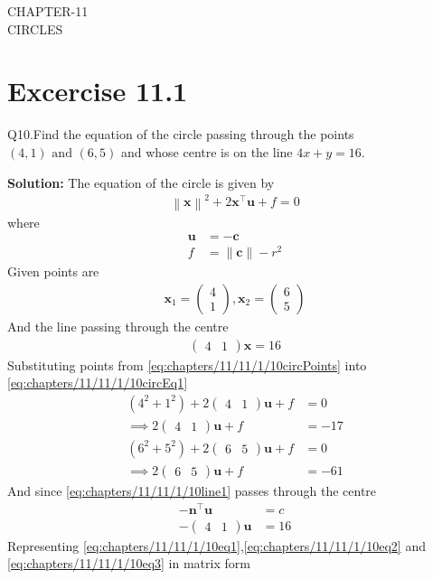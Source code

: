 \documentclass[12pt]{article}
\providecommand{\brak}[1]{\ensuremath{\left(#1\right)}}
\providecommand{\norm}[1]{\left\lVert#1\right\rVert}
\newcommand{\solution}{\noindent \textbf{Solution: }}
\newcommand{\myvec}[1]{\ensuremath{\begin{pmatrix}#1\end{pmatrix}}}
\let\vec\mathbf
\begin{document}
\begin{center}
\textbf\large{CHAPTER-11 \\ CIRCLES}

\end{center}
\section*{Excercise 11.1}

Q10.Find the equation of the circle passing through the points $\brak{4,1} \text{ and } \brak{6,5}$ and whose centre is on the line $4x + y = 16$.

\solution
\fi
The equation of the circle is given by
\begin{align}
	\label{eq:chapters/11/11/1/10circEq1}
	\norm{\vec{x}}^2 + 2\vec{x}^\top \vec{u} + f = 0
\end{align}
where
\begin{align}
	\vec{u} &= -\vec{c}\\
	      f &= \norm{\vec{c}} - r^2
\end{align}
Given points are
\begin{align}
	\label{eq:chapters/11/11/1/10circPoints}
	\vec{x}_{1} = \myvec{4\\1} , \vec{x}_{2} = \myvec{6\\5}
\end{align}
And the line passing through the centre
\begin{align}
	\label{eq:chapters/11/11/1/10line1}
	\myvec{4 & 1}\vec{x} = 16
\end{align}
Substituting points from \eqref{eq:chapters/11/11/1/10circPoints} into \eqref{eq:chapters/11/11/1/10circEq1}
\begin{align}
	\brak{4^2 + 1^2}+2\myvec{4 & 1}\vec{u}+f&=0\\
	\label{eq:chapters/11/11/1/10eq1}	
	\implies 2\myvec{4 & 1}\vec{u}+f&=-17\\
	\brak{6^2 + 5^2}+2\myvec{6 & 5}\vec{u}+f&=0\\
	\label{eq:chapters/11/11/1/10eq2}
	\implies 2\myvec{6 & 5}\vec{u}+f&=-61
\end{align}
And since \eqref{eq:chapters/11/11/1/10line1} passes through the centre
\begin{align}
	-\vec{n}^\top \vec{u} &= c\\
	\label{eq:chapters/11/11/1/10eq3}
	-\myvec{4 & 1}\vec{u} &= 16
\end{align}
Representing \eqref{eq:chapters/11/11/1/10eq1},\eqref{eq:chapters/11/11/1/10eq2} and \eqref{eq:chapters/11/11/1/10eq3} in matrix form
\end{document}
